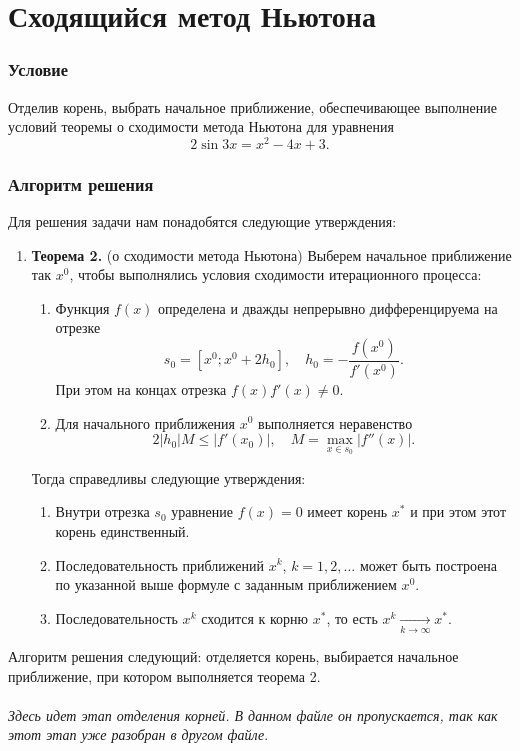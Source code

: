 \documentclass[a4paper, 12pt]{article}
\renewcommand{\leq}{\leqslant}
\begin{document}
	\section*{Сходящийся метод Ньютона}
	\subsubsection*{Условие}
	Отделив корень, выбрать начальное приближение, обеспечивающее выполнение условий теоремы о сходимости метода Ньютона для уравнения $$2\sin3x = x^2 - 4x + 3.$$
	\subsubsection*{Алгоритм решения}
	Для решения задачи нам понадобятся следующие утверждения:
	\begin{enumerate}
		\item \textbf{Теорема 2.}
		(о сходимости метода Ньютона)
		Выберем начальное приближение так $x^0$, чтобы выполнялись условия сходимости итерационного процесса:
		\begin{enumerate}
			\item Функция $f(x)$ определена и дважды непрерывно дифференцируема на отрезке $$s_0 = [x^0; x^0 + 2h_0],\quad h_0 =- \dfrac{f(x^0)}{f'(x^0)}.$$ При этом на концах отрезка $f(x)f'(x)\ne 0$.
			\item Для начального приближения $x^0$ выполняется неравенство $$2|h_0|M \leq |f'(x_0)|,\quad M = \underset{x\in s_0}{\max}|f''(x)|.$$
		\end{enumerate}
		Тогда справедливы следующие утверждения:
		\begin{enumerate}
			\item Внутри отрезка $s_0$ уравнение $f(x) = 0$ имеет корень $x^*$ и при этом этот корень единственный.
			\item Последовательность приближений $x^k$, $k=1,2,\ldots$ может быть построена по указанной выше формуле с заданным приближением $x^0$.
			\item Последовательность $x^k$ сходится к корню $x^*$, то есть $x^k \xrightarrow[k\to\infty]{}x^*$.
		\end{enumerate} 
	\end{enumerate}
	Алгоритм решения следующий: отделяется корень, выбирается начальное приближение, при котором выполняется теорема 2.\\\\
	\textit{Здесь идет этап отделения корней. В данном файле он пропускается, так как этот этап уже разобран в другом файле}.\\\\
\end{document}
